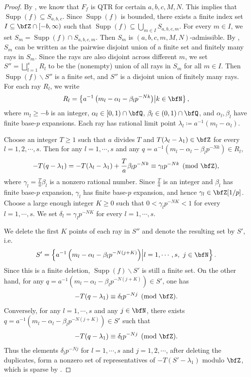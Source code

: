 \documentclass[english,oneside]{smfart}
\newcommand{\opn}[1]{\operatorname{#1}}
\begin{document}
\begin{proof}
    By , we know that $F_f$ is QTR for certain $a,b,c,M,N$. This implies that $\opn{Supp}(f)\subseteq S_{a,b,c}$. Since $\opn{Supp}(f)$ is bounded, there exists a finite index set $I\subseteq \bfZ\cap [-b,\infty)$ such that $\opn{Supp}(f)\subseteq\bigcup_{m\in I} S_{a,b,c,m}$. For every $m\in I$, we set $S_m=\opn{Supp}(f)\cap S_{a,b,c,m}$. Then $S_m$ is $(a,b,c,m,M,N)$-admissible. By , $S_m$ can be written as the pairwise disjoint union of a finite set and finitely many rays in $S_m$. Since the rays are also disjoint across different $m$, we set $S''=\bigsqcup_{l=1}^s R_l$ to be the (nonempty) union of all rays in $S_m$ for all $m\in I$. Then $\opn{Supp}(f)\backslash S''$ is a finite set, and $S''$ is a disjoint union of finitely many rays. For each ray $R_l$, we write
    $$R_l=\left\{a^{-1}\left(m_l-\alpha_l-\beta_l p^{-Nk}\right)\middle\vert k\in\bfN\right\},$$
    where $m_l\geq -b$ is an integer, $\alpha_l\in [0,1)\cap\bfQ$, $\beta_l\in (0,1)\cap\bfQ$, and $\alpha_l,\beta_l$ have finite base-$p$ expansions. Each ray has rational limit point $\lambda_l\coloneqq a^{-1}(m_l-\alpha_l)$.

    Choose an integer $T\geq 1$ such that $a$ divides $T$ and $T(\lambda_l-\lambda_1)\in\bfZ$ for every $l=1,2,\cdots,s$. Then for any $l=1,\cdots,s$ and any $q=a^{-1}(m_l-\alpha_l-\beta_l p^{-Nk})\in R_l$,
    $$-T(q-\lambda_1)=-T(\lambda_l-\lambda_1)+\frac{T}{a}\beta_l p^{-Nk}\equiv \gamma_l p^{-Nk}\pmod{\bfZ},$$
    where $\gamma_l=\frac{T}{a}\beta_l$ is a nonzero rational number. Since $\frac{T}{a}$ is an integer and $\beta_l$ has finite base-$p$ expansion, $\gamma_l$ has finite base-$p$ expansion, and hence $\gamma_l\in\bfZ[1/p]$. Choose a large enough integer $K\geq 0$ such that $0<\gamma_l p^{-NK}<1$ for every $l=1,\cdots,s$. We set $\delta_l=\gamma_l p^{-NK}$ for every $l=1,\cdots,s$.

    We delete the first $K$ points of each ray in $S''$ and denote the resulting set by $S'$, i.e.
    $$S'=\left\{a^{-1}\left(m_l-\alpha_l-\beta_l p^{-N(j+K)}\right)\middle\vert l=1,\cdots,s,\ j\in\bfN\right\}.$$
    Since this is a finite deletion, $\opn{Supp}(f)\backslash S'$ is still a finite set. On the other hand, for any $q=a^{-1}(m_l-\alpha_l-\beta_l p^{-N(j+K)})\in S'$, one has
    $$-T(q-\lambda_1)\equiv \delta_l p^{-Nj} \pmod{\bfZ}.$$
    Conversely, for any $l=1,\cdots,s$ and any $j\in\bfN$, there exists $q=a^{-1}(m_l-\alpha_l-\beta_l p^{-N(j+K)})\in S'$ such that
    $$-T(q-\lambda_1)\equiv \delta_l p^{-Nj}\pmod{\bfZ}.$$
    Thus the elements $\delta_l p^{-Nj}$ for $l=1,\cdots,s$ and $j=1,2,\cdots$, after deleting the duplicates, form a nonzero set of representatives of $-T(S'-\lambda_1)$ modulo $\bfZ$, which is sparse by .
\end{proof}
\end{document}

